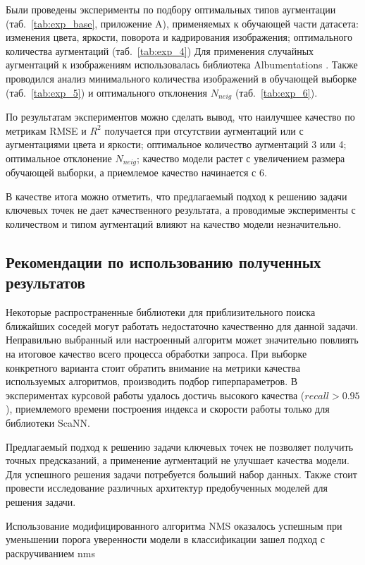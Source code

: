 \documentclass[a4paper,14pt]{article}
\begin{document}
    Были проведены эксперименты по подбору оптимальных типов аугментации (таб.~\ref{tab:exp_base}, приложение A), применяемых к обучающей части датасета: изменения цвета, яркости, поворота и кадрирования изображения; оптимального количества аугментаций (таб.~\ref{tab:exp_4})
    Для применения случайных аугментаций к изображениям использовалась библиотека Albumentations \cite{albumentations}.
	Также проводился анализ минимального количества изображений в обучающей выборке (таб.~\ref{tab:exp_5}) и оптимального отклонения $N_{neig}$ (таб.~\ref{tab:exp_6}).

    По результатам экспериментов можно сделать вывод, что наилучшее качество по метрикам RMSE и $R^2$ получается при отсутствии аугментаций или с аугментациями цвета и яркости; оптимальное количество аугментаций 3 или 4; оптимальное отклонение $N_{neig}$; качество модели растет с увеличением размера обучающей выборки, а приемлемое качество начинается с 6.
    
    В качестве итога можно отметить, что предлагаемый подход к решению задачи ключевых точек не дает качественного результата, а проводимые эксперименты с количеством и типом аугментаций влияют на качество модели незначительно.

    \subsection{Рекомендации по использованию полученных результатов}

    Некоторые распространенные библиотеки для приблизительного поиска ближайших соседей могут работать недостаточно качественно для данной задачи.
    Неправильно выбранный или настроенный алгоритм может значительно повлиять на итоговое качество всего процесса обработки запроса.
    При выборке конкретного варианта стоит обратить внимание на метрики качества используемых алгоритмов, производить подбор гиперпараметров.
    В экспериментах курсовой работы удалось достичь высокого качества ($recall > 0.95$), приемлемого времени построения индекса и скорости работы только для библиотеки ScaNN.

	Предлагаемый подход к решению задачи ключевых точек не позволяет получить точных предсказаний, а применение аугментаций не улучшает качества модели.
    Для успешного решения задачи потребуется больший набор данных.
    Также стоит провести исследование различных архитектур предобученных моделей для решения задачи.

	Использование модифицированного алгоритма NMS оказалось успешным при уменьшении порога уверенности модели в классификации
    зашел подход с раскручиванием nms
    
\end{document}
